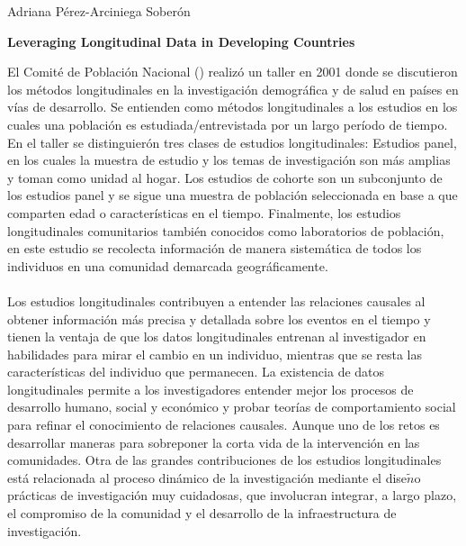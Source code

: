 \documentclass[10pt,spanish,letterpaper]{article}
\theoremstyle{plain}
\begin{document}
\begin{flushleft}
Adriana P\'erez-Arciniega Sober\'on
\end{flushleft}
\begin{center}
\textbf{Leveraging Longitudinal Data in Developing Countries}
\end{center}
El Comit\'e de Poblaci\'on Nacional (\cite{national2002leveraging}) realiz\'o un taller en 2001 donde se discutieron los m\'etodos longitudinales en la investigaci\'on demogr\'afica y de salud en pa\'ises en v\'ias de desarrollo. Se entienden como m\'etodos longitudinales a los estudios en los cuales una poblaci\'on es estudiada/entrevistada por un largo per\'iodo de tiempo. En el taller se distinguier\'on tres clases de estudios longitudinales: Estudios panel, en los cuales la muestra de estudio y los temas de investigaci\'on son m\'as amplias y toman como unidad al hogar. Los estudios de cohorte son un subconjunto de los estudios panel y se sigue una muestra de poblaci\'on seleccionada en base a que comparten edad o caracter\'isticas en el tiempo. Finalmente, los estudios longitudinales comunitarios tambi\'en conocidos como laboratorios de poblaci\'on, en este estudio se recolecta informaci\'on de manera sistem\'atica de todos los individuos en una comunidad demarcada geogr\'aficamente. \\
\\
Los estudios longitudinales contribuyen a entender las relaciones causales al obtener informaci\'on m\'as precisa y detallada sobre los eventos en el tiempo y tienen la ventaja de que los datos longitudinales entrenan al investigador en habilidades para mirar el cambio en un individuo, mientras que se resta las caracter\'isticas del individuo que permanecen. La existencia de datos longitudinales permite a los investigadores entender mejor los procesos de desarrollo humano, social y econ\'omico y probar teor\'ias de comportamiento social para refinar el conocimiento de relaciones causales. Aunque uno de los retos es desarrollar maneras para sobreponer la corta vida de la intervenci\'on en las comunidades. Otra de las grandes contribuciones de los estudios longitudinales est\'a relacionada al proceso din\'amico de la investigaci\'on mediante el dise$\tilde{n}$o pr\'acticas de investigaci\'on muy cuidadosas, que involucran integrar, a largo plazo, el compromiso de la comunidad y el desarrollo de la infraestructura de investigaci\'on.\\
\\
\end{document}
